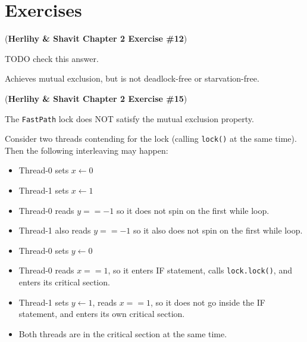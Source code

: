 \section{Exercises}

\begin{exercise}
    (\textbf{Herlihy \& Shavit Chapter 2 Exercise \#12})
\end{exercise}
\begin{solution}
    TODO check this answer.

    Achieves mutual exclusion, but is not deadlock-free or starvation-free.
\end{solution}

\begin{exercise}
    (\textbf{Herlihy \& Shavit Chapter 2 Exercise \#15})
\end{exercise}
\begin{solution}
    The \verb|FastPath| lock does NOT satisfy the mutual exclusion property.
    
    Consider two threads contending for the lock (calling \verb|lock()| at the same time). Then the following interleaving may happen:
    \begin{itemize}
        \item Thread-0 sets $x \leftarrow 0$
        \item Thread-1 sets $x \leftarrow 1$
        \item Thread-0 reads $y == -1$ so it does not spin on the first while loop.
        \item Thread-1 also reads $y == -1$ so it also does not spin on the first while loop.
        \item Thread-0 sets $y \leftarrow 0$
        \item Thread-0 reads $x == 1$, so it enters IF statement, calls \verb|lock.lock()|, and enters its critical section.
        \item Thread-1 sets $y \leftarrow 1$, reads $x == 1$, so it does not go inside the IF statement, and enters its own critical section.
        \item Both threads are in the critical section at the same time.
    \end{itemize}
\end{solution}


